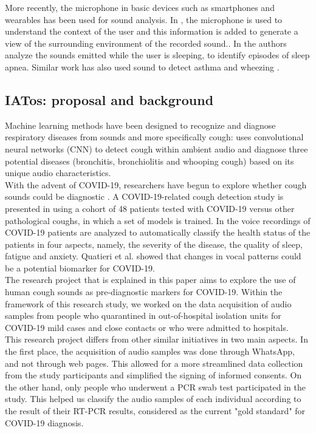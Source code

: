 \documentclass{nle}
\begin{document}
More recently, the microphone in basic devices such as smartphones and wearables has been used for sound analysis. In \cite{12}, the microphone is used to understand the context of the user and this information is added to generate a view of the surrounding environment of the recorded sound.. In \cite{13} the authors analyze the sounds emitted while the user is sleeping, to identify episodes of sleep apnea. Similar work has also used sound to detect asthma and wheezing \cite{2} \cite{3}.

\subsection{IATos: proposal and background}

Machine learning methods have been designed to recognize and diagnose respiratory diseases from sounds \cite{1} and more specifically cough: \cite{14} uses convolutional neural networks (CNN) to detect cough within ambient audio and diagnose three potential diseases (bronchitis, bronchiolitis and whooping cough) based on its unique audio characteristics.\\

With the advent of COVID-19, researchers have begun to explore whether cough sounds could be diagnostic \cite{15}. A COVID-19-related cough detection study is presented in \cite{15} using a cohort of 48 patients tested with COVID-19 versus other pathological coughs, in which a set of models is trained. In \cite{11} the voice recordings of COVID-19 patients are analyzed to automatically classify the health status of the patients in four aspects, namely, the severity of the disease, the quality of sleep, fatigue and anxiety. Quatieri et al. \cite{26} showed that changes in vocal patterns could be a potential biomarker for COVID-19.\\

The research project that is explained in this paper aims to explore the use of human cough sounds as pre-diagnostic markers for COVID-19. Within the framework of this research study, we worked on the data acquisition of audio samples from people who quarantined in out-of-hospital isolation units for COVID-19 mild cases and close contacts or who were admitted to hospitals.\\

This research project differs from other similar initiatives in two main aspects. In the first place, the acquisition of audio samples was done through WhatsApp, and not through web pages. This allowed for a more streamlined data collection from the  study participants and simplified the signing of informed consents. On the other hand, only people who underwent a PCR swab test participated in the study. This helped us classify the audio samples of each individual according to the result of their RT-PCR results, considered as the current "gold standard" for COVID-19 diagnosis.\\
\end{document}
